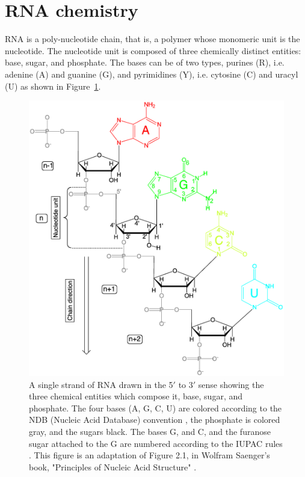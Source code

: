 \section{RNA chemistry}
RNA is  a poly-nucleotide  chain, that is,  a polymer  whose monomeric
unit  is the  nucleotide.  The  nucleotide unit  is composed  of three
chemically distinct  entities: base,  sugar, and phosphate.  The bases
can be  of two types, purines  (R), i.e. adenine (A)  and guanine (G),
and  pyrimidines (Y), i.e.  cytosine (C)  and uracyl  (U) as  shown in
Figure~\ref{fig:chemistry1}.
\begin{figure}
\centering
\includegraphics[scale=0.8]{Chapter1/chemistry1b.png}
\caption{A  single strand  of  RNA drawn  in  the 5$'$  to 3$'$  sense
  showing the  three chemical entities which compose  it, base, sugar,
  and phosphate.  The four bases (A, G, C, U) are colored according to
  the  NDB  (Nucleic  Acid  Database)  convention  \cite{ndburl},  the
  phosphate is colored gray, and the sugars black. The bases G, and C,
  and the furanose  sugar attached to the G  are numbered according to
  the IUPAC  rules \cite{iupac1983}. This  figure is an  adaptation of
  Figure 2.1,  in Wolfram Saenger's book, "Principles  of Nucleic Acid
  Structure" \cite{saenger1984}.}
\label{fig:chemistry1}
\end{figure}  

